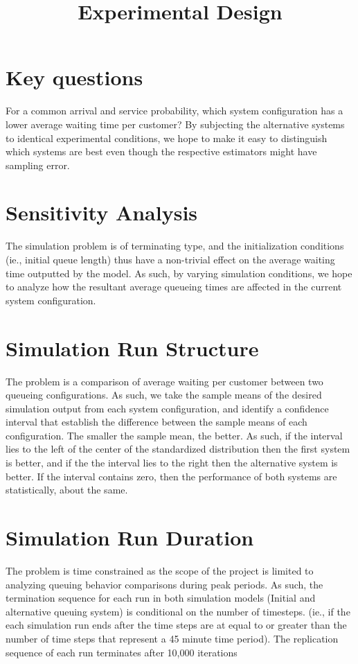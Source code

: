 \documentclass{article}
\begin{document}
\pagecolor{ultramarine}
\title{Experimental Design}
\author{}
\date{}
\maketitle
\section{Key questions}
For a common arrival and service probability, which system configuration has a lower average waiting time per customer? By subjecting the alternative systems to identical experimental conditions, we hope to make it easy to distinguish which systems are best even though the respective estimators might have sampling error.

\section{Sensitivity Analysis}
The simulation problem is of terminating type, and the initialization conditions (ie., initial queue length) thus have a non-trivial effect on the average waiting time outputted by the model. As such, by varying simulation conditions, we hope to analyze how the resultant average queueing times are affected in the current system configuration.

\section{Simulation Run Structure}
The problem is a comparison of average waiting per customer between two queueing configurations. As such, we take the sample means of the desired simulation output from each system configuration, and identify a confidence interval that establish the difference between the sample means of each configuration. The smaller the sample mean, the better. As such, if the interval lies to the left of the center of the standardized distribution then the first system is better, and if the the interval lies to the right then the alternative system is better. If the interval contains zero, then the performance of both systems are statistically, about the same.

\section{Simulation Run Duration}
The problem is time constrained as the scope of the project is limited to analyzing queuing behavior comparisons during peak periods. As such, the termination sequence for each run in both simulation models (Initial and alternative queuing system) is conditional on the number of timesteps. (ie., if the each simulation run ends after the time steps are at equal to or greater than the number of time steps that represent a 45 minute time period). The replication sequence of each run terminates after 10,000 iterations
\end{document}
